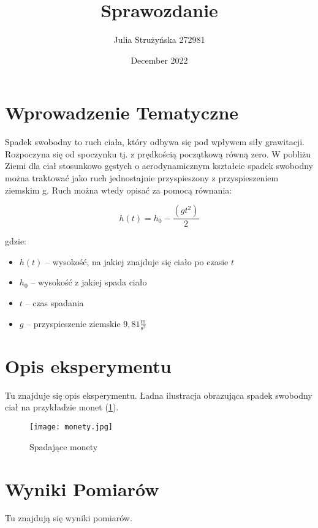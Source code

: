 \documentclass{article}
\title{Sprawozdanie}
\author{Julia Strużyńska 272981}
\date{December 2022}
\begin{document}
\maketitle
\section{Wprowadzenie Tematyczne}
Spadek swobodny to ruch ciała, który odbywa się pod wpływem siły grawitacji. Rozpoczyna się od spoczynku tj. z prędkością początkową równą zero. W pobliżu Ziemi dla ciał stosunkowo gęstych o aerodynamicznym kształcie spadek swobodny można traktować jako ruch jednostajnie przyspieszony z przyspieszeniem ziemskim g. Ruch można wtedy opisać za pomocą równania:

\begin{equation}
h(t)=h_0-\frac{(gt^2)} {2}
\end{equation}

gdzie:
\begin{itemize}
	\item \(h(t)\) – wysokość, na jakiej znajduje się ciało po czasie \(t\)
	\item \(h_0\) – wysokość z jakiej spada ciało
	\item \(t\) – czas spadania
	\item \(g\) – przyspieszenie ziemskie \(9,81 \frac{\text{m}} {\text{s}^2}\)
\end{itemize}

\maketitle
\section{Opis eksperymentu}

Tu znajduje się opis eksperymentu. Ładna ilustracja obrazująca spadek swobodny ciał na przykładzie monet (\ref{fig:spadek.swobodny}).

\begin{figure}[htbp]
    \centering
    \texttt{[image: monety.jpg]}
    \caption{Spadające monety}
    \label{fig:spadek.swobodny}
\end{figure}

\maketitle
\section{Wyniki Pomiarów}
Tu znajdują się wyniki pomiarów.
\end{document}
